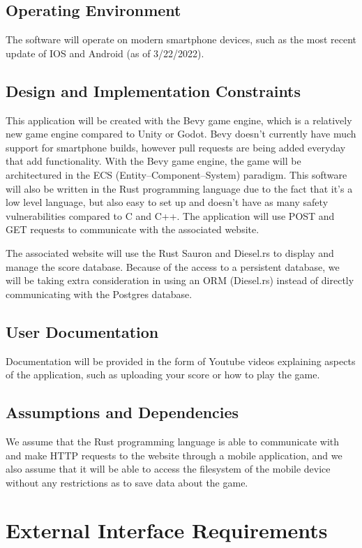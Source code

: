 \documentclass[11pt]{article}
\begin{document}
\subsection{Operating Environment}
\label{sec:org747ed52}
The software will operate on modern smartphone devices, such as the most recent update of IOS and Android (as of 3/22/2022). 
\subsection{Design and Implementation Constraints}
\label{sec:org7ed9e72}
This application will be created with the Bevy game engine, which is a relatively new game engine compared to Unity or Godot. Bevy doesn’t currently have much support for smartphone builds, however pull requests are being added everyday that add functionality. With the Bevy game engine, the game will be architectured in the ECS (Entity–Component–System) paradigm. This software will also be written in the Rust programming language due to the fact that it's a low level language, but also easy to set up and doesn’t have as many safety vulnerabilities compared to C and C++. The application will use POST and GET requests to communicate with the associated website. 

The associated website will use the Rust Sauron and Diesel.rs to display and manage the score database. Because of the access to a persistent database, we will be taking extra consideration in using an ORM (Diesel.rs) instead of directly communicating with the Postgres database. 
\subsection{User Documentation}
\label{sec:org95774d1}
Documentation will be provided in the form of Youtube videos explaining aspects of the application, such as uploading your score or how to play the game. 
\subsection{Assumptions and Dependencies}
\label{sec:orgf15a5c1}
We assume that the Rust programming language is able to communicate with and make HTTP requests to the website through a mobile application, and we also assume that it will be able to access the filesystem of the mobile device without any restrictions as to save data about the game. 
\section{External Interface Requirements}
\label{sec:org0b87343}
\end{document}
